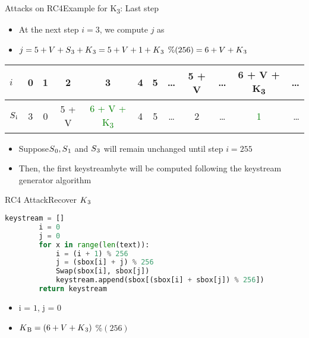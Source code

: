 \documentclass[
	aspectratio=169,	%
	onlytextwidth,		%
	t,					%
	]{beamer}
\begin{document}
\begin{frame}[fragile]{Attacks on RC4}{Example for K\textsubscript{3}: Last step}

	
	\begin{itemize}
		\item At the next step $i = 3$, we compute $j$ as
		\item $j = 5 + V + S\textsubscript{3} + K\textsubscript{3} = 5 + V + 1 + K\textsubscript{3}$ $\%(256) = 6 + V + K\textsubscript{3}$
	\end{itemize}
	
	\begin{table}[h!]
		\begin{center}
			\begin{tabular}{l|c|c|c|c|c|c|c|c|c|c|r}
			$i$ & 0 & 1 & 2 & 3 & 4 & 5 & \dots & 5 + V & \dots & 6 + V + K\textsubscript{3} & \dots\\
			\hline
			$S\textsubscript{i}$ & 3 & 0 & 5 + V & \textcolor{green}{6 + V + K\textsubscript{3}} & 4 & 5 & \dots & 2 & \dots & \textcolor{green}{1} & \dots\\
			\end{tabular}
		\end{center}
	\end{table}

	\begin{itemize}
		\item Suppose$ S\textsubscript{0}, S\textsubscript{1}$ and $S\textsubscript{3}$ will remain unchanged until step $i = 255$
		\item Then, the first keystreambyte will be computed following the keystream generator algorithm
	\end{itemize}

\end{frame}

\begin{frame}[fragile]{RC4 Attack}{Recover $K\textsubscript{3}$}

	\begin{lstlisting}[language=Python]
		keystream = []
		i = 0
		j = 0
		for x in range(len(text)):
			i = (i + 1) % 256
			j = (sbox[i] + j) % 256
			Swap(sbox[i], sbox[j])
			keystream.append(sbox[(sbox[i] + sbox[j]) % 256])    
		return keystream   
	\end{lstlisting}
	\begin{itemize}
		\item i = $1$, j = $0$
		\item $K\textsubscript{B} = (6 + V + K\textsubscript{3})$ $\% (256)$
	\end{itemize}

\end{frame}
\end{document}
